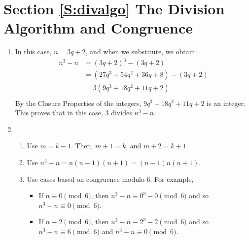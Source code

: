 \section*{Section \ref{S:divalgo} The Division Algorithm and Congruence}


\begin{enumerate}

\item In this case,  $n = 3q + 2$, and when we substitute, we obtain
\[
\begin{aligned}
  n^3  - n &= \left( {3q + 2} \right)^3  - \left( {3q + 2} \right) \\ 
           &= \left( {27q^3  + 54q^2  + 36q + 8} \right) - \left( {3q + 2} \right) \\ 
           &= 3\left( {9q^3  + 18q^2  + 11q + 2} \right) \\ 
\end{aligned} 
\]
By the Closure Properties of the integers,  $9q^3  + 18q^2  + 11q + 2$  is an integer.  This proves that in this case, 3  divides  $n^3  - n$.



\item \begin{enumerate}
\item Use $m = k - 1$.  Then, $m +1 = k$, and $m + 2 = k + 1$.

\item Use $n^3 - n = n \left( n - 1 \right) \left( n + 1 \right) = 
\left( n - 1 \right) n \left( n + 1 \right)$.

\item Use cases based on congruence modulo 6.  For example,
\begin{itemize}
\item If $n \equiv 0 \pmod 6$, then $n^3 - n \equiv 0^3 - 0 \pmod 6$ and so 
$n^3 - n \equiv 0 \pmod 6$.

\item If $n \equiv 2 \pmod 6$, then $n^3 - n \equiv 2^3 - 2 \pmod 6$ and so 
$n^3 - n \equiv 6 \pmod 6$ and $n^3 - n \equiv 0 \pmod 6$.


\end{itemize}
\end{enumerate}
\end{enumerate}
